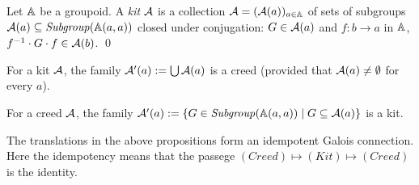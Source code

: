 \begin{definition}[Kit]
    Let \( \mathbb{A} \) be a groupoid.
    A \emph{kit} \( \mathcal{A} \) is a collection \( \mathcal{A} = (\mathcal{A}(a))_{a \in \mathbb{A}} \) of sets of subgroups \( \mathcal{A}(a) \subseteq \mathit{Subgroup}(\mathbb{A}(a,a)) \) closed under conjugation: \( G \in \mathcal{A}(a) \) and \( f \colon b \longrightarrow a \) in \( \mathbb{A} \), \( f^{-1} \cdot G \cdot f \in \mathcal{A}(b) \).
    \qed
\end{definition}

\begin{proposition}
    For a kit \( \mathcal{A} \), the family \( \mathcal{A}'(a) := \bigcup \mathcal{A}(a) \) is a creed (provided that \( \mathcal{A}(a) \neq \emptyset \) for every \( a \)).
\end{proposition}

\begin{proposition}
    For a creed \( \mathcal{A} \), the family \( \mathcal{A}'(a) := \{ G \in \mathit{Subgroup}(\mathbb{A}(a,a)) \mid G \subseteq \mathcal{A}(a) \} \) is a kit.
\end{proposition}

The translations in the above propositions form an idempotent Galois connection.
Here the idempotency means that the passege \( (\mathit{Creed}) \mapsto (\mathit{Kit}) \mapsto (\mathit{Creed}) \) is the identity.
